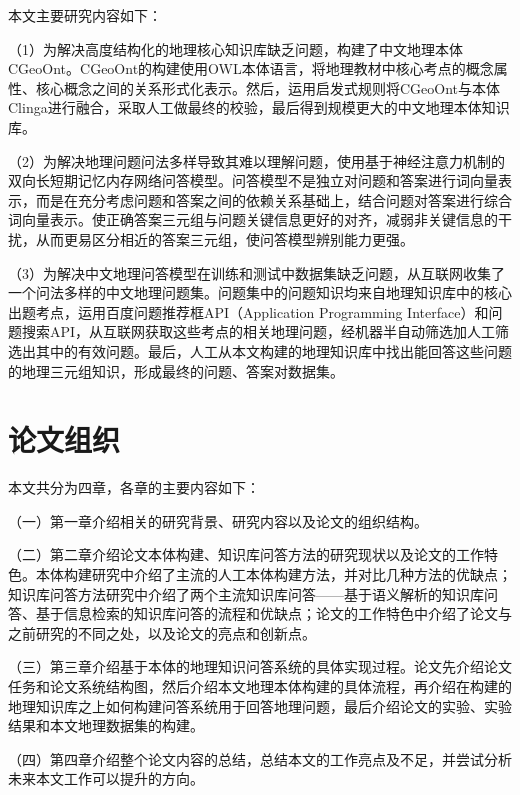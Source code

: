 本文主要研究内容如下：

（1）为解决高度结构化的地理核心知识库缺乏问题，构建了中文地理本体CGeoOnt。CGeoOnt的构建使用OWL本体语言，将地理教材中核心考点的概念属性、核心概念之间的关系形式化表示。然后，运用启发式规则将CGeoOnt与本体Clinga进行融合，采取人工做最终的校验，最后得到规模更大的中文地理本体知识库。

（2）为解决地理问题问法多样导致其难以理解问题，使用基于神经注意力机制的双向长短期记忆内存网络问答模型。问答模型不是独立对问题和答案进行词向量表示，而是在充分考虑问题和答案之间的依赖关系基础上，结合问题对答案进行综合词向量表示。使正确答案三元组与问题关键信息更好的对齐，减弱非关键信息的干扰，从而更易区分相近的答案三元组，使问答模型辨别能力更强。

（3）为解决中文地理问答模型在训练和测试中数据集缺乏问题，从互联网收集了一个问法多样的中文地理问题集。问题集中的问题知识均来自地理知识库中的核心出题考点，运用百度问题推荐框API（Application Programming Interface）和问题搜索API，从互联网获取这些考点的相关地理问题，经机器半自动筛选加人工筛选出其中的有效问题。最后，人工从本文构建的地理知识库中找出能回答这些问题的地理三元组知识，形成最终的问题、答案对数据集。

\section{论文组织}
本文共分为四章，各章的主要内容如下：

（一）第一章介绍相关的研究背景、研究内容以及论文的组织结构。

（二）第二章介绍论文本体构建、知识库问答方法的研究现状以及论文的工作特色。本体构建研究中介绍了主流的人工本体构建方法，并对比几种方法的优缺点；知识库问答方法研究中介绍了两个主流知识库问答——基于语义解析的知识库问答、基于信息检索的知识库问答的流程和优缺点；论文的工作特色中介绍了论文与之前研究的不同之处，以及论文的亮点和创新点。

（三）第三章介绍基于本体的地理知识问答系统的具体实现过程。论文先介绍论文任务和论文系统结构图，然后介绍本文地理本体构建的具体流程，再介绍在构建的地理知识库之上如何构建问答系统用于回答地理问题，最后介绍论文的实验、实验结果和本文地理数据集的构建。

（四）第四章介绍整个论文内容的总结，总结本文的工作亮点及不足，并尝试分析未来本文工作可以提升的方向。